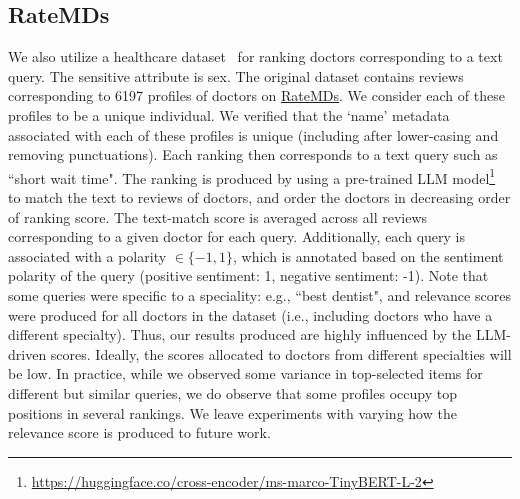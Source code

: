 \subsection{RateMDs}
We also utilize a healthcare dataset~\cite{thawani2019online} for ranking doctors corresponding to a text query. The sensitive attribute is sex. The original dataset contains reviews corresponding to 6197 profiles of doctors on \href{https://www.ratemds.com/}{RateMDs}. We consider each of these profiles to be a unique individual. We verified that the `name' metadata associated with each of these profiles is unique (including after lower-casing and removing punctuations).  Each ranking then corresponds to a text query such as ``short wait time". The ranking is produced by using a pre-trained LLM model\footnote{\url{https://huggingface.co/cross-encoder/ms-marco-TinyBERT-L-2}} to match the text to reviews of doctors, and order the doctors in decreasing order of ranking score. The text-match score is averaged across all reviews corresponding to a given doctor for each query. Additionally, each query is associated with a polarity $\in \{-1,1\}$, which is annotated based on the sentiment polarity of the query (positive sentiment: 1, negative sentiment: -1). Note that some queries were specific to a speciality: e.g., ``best dentist", and relevance scores were produced for all doctors in the dataset (i.e., including doctors who have a different specialty). Thus, our results produced are highly influenced by the LLM-driven scores. Ideally, the scores allocated to doctors from different specialties will be low. In practice, while we observed some variance in top-selected items for different but similar queries, we do observe that some profiles occupy top positions in several rankings. We leave experiments with varying how the relevance score is produced to future work. 

